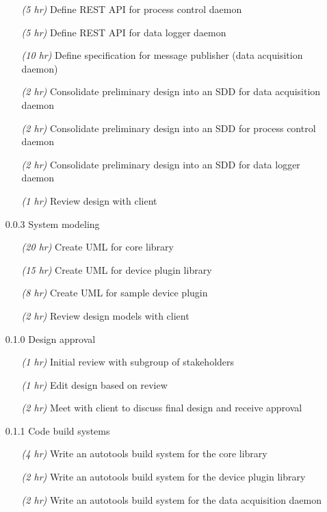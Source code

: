 \begin{itemize}
\begin{itemize}
          \item[\emph{(5 hr)}] Define REST API for process control daemon
          \item[\emph{(5 hr)}] Define REST API for data logger daemon
          \item[\emph{(10 hr)}] Define specification for message publisher (data acquisition daemon)
          \item[\emph{(2 hr)}] Consolidate preliminary design into an SDD for data acquisition daemon
          \item[\emph{(2 hr)}] Consolidate preliminary design into an SDD for process control daemon
          \item[\emph{(2 hr)}] Consolidate preliminary design into an SDD for data logger daemon
          \item[\emph{(1 hr)}] Review design with client
        \end{itemize}
      \item[0.0.3] System modeling
        \begin{itemize}
          \item[\emph{(20 hr)}] Create UML for core library
          \item[\emph{(15 hr)}] Create UML for device plugin library
          \item[\emph{(8 hr)}] Create UML for sample device plugin
          \item[\emph{(2 hr)}] Review design models with client
        \end{itemize}
      \item[0.1.0] Design approval
        \begin{itemize}
          \item[\emph{(1 hr)}] Initial review with subgroup of stakeholders
          \item[\emph{(1 hr)}] Edit design based on review
          \item[\emph{(2 hr)}] Meet with client to discuss final design and receive approval
        \end{itemize}
      \item[0.1.1] Code build systems
        \begin{itemize}
          \item[\emph{(4 hr)}] Write an autotools build system for the core library
          \item[\emph{(2 hr)}] Write an autotools build system for the device plugin library
          \item[\emph{(2 hr)}] Write an autotools build system for the data acquisition daemon

\end{itemize}
\end{itemize}
